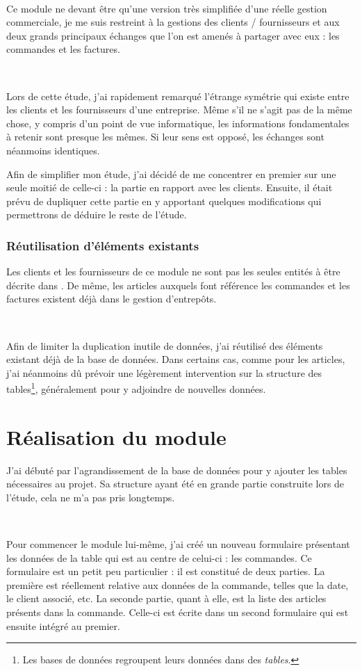 ~

Ce module ne devant être qu'une version très simplifiée d'une \og réelle \fg{} gestion commerciale, je me suis restreint à la gestions des clients / fournisseurs et aux deux grands principaux échanges que l'on est amenés à partager avec eux : les commandes et les factures.

~

Lors de cette étude, j'ai rapidement remarqué l'étrange symétrie qui existe entre les clients et les fournisseurs d'une entreprise. Même s'il ne s'agit pas de la même chose, y compris d'un point de vue informatique, les informations fondamentales à retenir sont presque les mêmes. Si leur sens est opposé, les échanges sont néanmoins identiques.

Afin de simplifier mon étude, j'ai décidé de me concentrer en premier sur une seule moitié de celle-ci : la partie en rapport avec les clients. Ensuite, il était prévu de dupliquer cette partie en y apportant quelques modifications qui permettrons de déduire le reste de l'étude.

\subsubsection{Réutilisation d'éléments existants}
Les clients et les fournisseurs de ce module ne sont pas les seules \og entités \fg{} à être décrite dans \integrale. De même, les articles auxquels font référence les commandes et les factures existent déjà dans le gestion d'entrepôts.

~

Afin de limiter la duplication inutile de données, j'ai réutilisé des éléments existant déjà de la base de données. Dans certains cas, comme pour les articles, j'ai néanmoins dû prévoir une légèrement intervention sur la structure des tables\footnote{Les bases de données regroupent leurs données dans des \emph{tables}.}, généralement pour y adjoindre de nouvelles données.

\section{Réalisation du module}
J'ai débuté par l'agrandissement de la base de données pour y ajouter les tables nécessaires au projet. Sa structure ayant été en grande partie construite lors de l'étude, cela ne m'a pas pris longtemps.

~

Pour commencer le module lui-même, j'ai créé un nouveau formulaire présentant les données de la table qui est au centre de celui-ci : les commandes. Ce formulaire est un petit peu particulier : il est constitué de deux parties. La première est réellement relative aux données de la commande, telles que la date, le client associé, etc. La seconde partie, quant à elle, est la liste des articles présents dans la commande. Celle-ci est écrite dans un second formulaire qui est ensuite intégré au premier.

